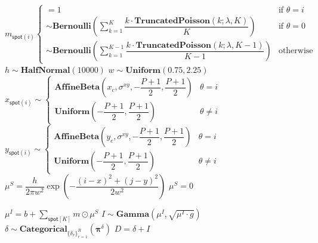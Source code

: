 \begin{algorithm}
\begin{algorithmic}[1]
            \State $ m_{\mathsf{spot}(i)}
                \begin{cases}
                    = 1 & \text{if $\theta = i$} \\
                    \sim \mathbf{Bernoulli} \left( \sum_{k=1}^K \dfrac{k \cdot \mathbf{TruncatedPoisson}(k; \lambda, K)}{K} \right) & \text{if $\theta = 0$} \\
                    \sim \mathbf{Bernoulli} \left( \sum_{k=1}^{K-1} \dfrac{k \cdot \mathbf{TruncatedPoisson}(k; \lambda, K-1)}{K-1} \right) & \text{otherwise}
                \end{cases} $
                \State $h \sim \textbf{HalfNormal}(10000)$
                \State $w \sim \textbf{Uniform}(0.75, 2.25)$
                \State $ x_{\mathsf{spot}(i)} \sim
                    \begin{cases}
                    \mathbf{AffineBeta}\left( x_c, \sigma^{xy}, -\dfrac{P+1}{2}, \dfrac{P+1}{2} \right) & \theta = i \\
                    \mathbf{Uniform}\left(-\dfrac{P+1}{2}, \dfrac{P+1}{2} \right) & \theta \neq i \end{cases} $
                \State $ y_{\mathsf{spot}(i)} \sim
                    \begin{cases}
                    \mathbf{AffineBeta}\left( y_c, \sigma^{xy}, -\dfrac{P+1}{2}, \dfrac{P+1}{2} \right) & \theta = i \\
                    \mathbf{Uniform}\left(-\dfrac{P+1}{2}, \dfrac{P+1}{2} \right) & \theta \neq i \end{cases}
                    $
                \State $\mu^{S} =
                            \dfrac{h}{2 \pi w^2} \exp{\left ( -\dfrac{(i-x)^2 + (j-y)^2}{2w^2} \right)}$
                \EndFor
                \State $\mu^S = 0$
            \EndIf
        \EndFor
            
            \State $\mu^I = b + \sum_{\mathsf{spot}[K]} m \odot \mu^S$
            \State $I \sim \mathbf{Gamma} (\mu^I, \sqrt{\mu^I \cdot g})$
            \State $\delta \sim \mathbf{Categorical}_{\{ \delta_r \}^R_{r=1}}(\mathbf{\pi}^\delta)$
            \State \Return $D = \delta + I$
        \EndFor
    \EndFor
\EndFor
\end{algorithmic}
\end{algorithm}